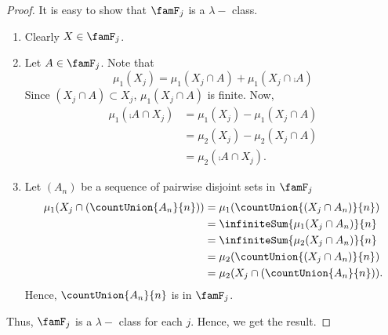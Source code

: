 \begin{proof}
    It is easy to show that $\famF_{j}$ is a $\lambda-$ class.
    \begin{enumerate}
	\item Clearly $X \in \famF_{j}$.
	\item Let $A \in \famF_{j}$. Note that
	    \[\mu_1(X_j) = \mu_1(X_j \cap A) + \mu_1(X_j \cap \comp{A})\]
	    Since $(X_j\cap A) \subset X_j$, $\mu_1(X_j\cap A)$ is finite.
	    Now,
	    \begin{align*}
		\mu_1(\comp{A}\cap X_j) &= \mu_1(X_j) - \mu_1(X_j \cap A) \\
		& = \mu_2(X_j) - \mu_2(X_j \cap A) \\
		& = \mu_2(\comp{A}\cap X_j).
	    \end{align*}
	\item Let $(A_n)$ be a sequence of pairwise disjoint sets in $\famF_{j}$
	    \begin{align*}
		\mu_1(X_j \cap \left(\countUnion{A_n}{n}\right)) &= \mu_1(\countUnion{(X_j\cap A_n)}{n}) \\
		& = \infiniteSum{\mu_1(X_j\cap A_n)}{n} \\
		& = \infiniteSum{\mu_2(X_j\cap A_n)}{n} \\
		& = \mu_2(\countUnion{(X_j\cap A_n)}{n}) \\
		& = \mu_2(X_j \cap \left(\countUnion{A_n}{n}\right)).
	    \end{align*}
	    Hence, $\countUnion{A_n}{n}$ is in $\famF_j$.
    \end{enumerate}
    Thus, $\famF_j$ is a $\lambda-$ class for each $j$. Hence, we get the result.
\end{proof}
